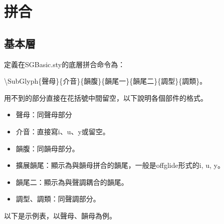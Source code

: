 \section{拼合}
\subsection{基本層}
定義在SGBasic.sty的底層拼合命令為：\par
{\textbackslash}SubGlyph\{聲母\}\{介音\}{\{}韻腹{\}}\{韻尾一\}\{韻尾二\}{\{}調型{\}}{\{}調類{\}}。\par
用不到的部分直接在花括號中間留空，以下說明各個部件的格式。\par
\begin{itemize}
	\item 聲母：同聲母部分
	\item 介音：直接寫i、u、y或留空。
	\item 韻腹：同韻母部分。
	\item 擴展韻尾：顯示為與韻母拼合的韻尾，一般是offglide形式的i, u, y。
	\item 韻尾二：顯示為與聲調耦合的韻尾。
	\item 調型、調類：同聲調部分。
\end{itemize}
以下是示例表，以聲母、韻母為例。\par
%


